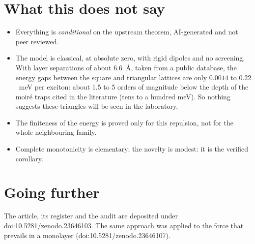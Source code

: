\section*{What this does not say}

\begin{limite}
\begin{itemize}
\item Everything is \emph{conditional} on the upstream theorem, AI-generated and not peer reviewed.
\item The model is classical, at absolute zero, with rigid dipoles and no screening. With layer separations of about
  $6.6$~\AA, taken from a public database, the energy gaps between the square and triangular lattices are only
  $0.0014$ to $0.22$~meV per exciton: about 1.5 to 5 orders of magnitude below the depth of the moir\'e traps cited
  in the literature (tens to a hundred meV). So nothing suggests these triangles will be seen in the laboratory.
\item The finiteness of the energy is proved only for this repulsion, not for the whole neighbouring family.
\item Complete monotonicity is elementary; the novelty is modest: it is the verified corollary.
\end{itemize}
\end{limite}

\section*{Going further}

The article, its register and the audit are deposited under doi:10.5281/\allowbreak zenodo.23646103. The same
approach was applied to the force that prevails in a monolayer (doi:10.5281/zenodo.23646107).
